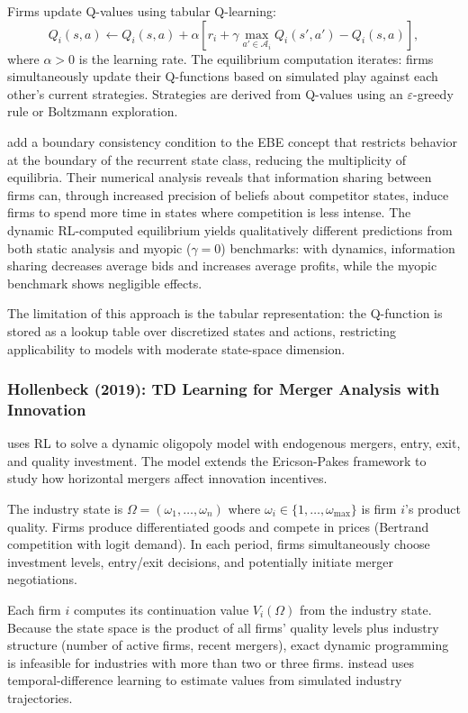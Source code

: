 Firms update Q-values using tabular Q-learning:
\begin{equation}
Q_i(s, a) \leftarrow Q_i(s, a) + \alpha\left[r_i + \gamma \max_{a' \in \mathcal{A}_i} Q_i(s', a') - Q_i(s, a)\right], \label{eq:asker_qupdate}
\end{equation}
where $\alpha > 0$ is the learning rate. The equilibrium computation iterates: firms simultaneously update their Q-functions based on simulated play against each other's current strategies. Strategies are derived from Q-values using an $\varepsilon$-greedy rule or Boltzmann exploration.

\citet{AskerEtAl2020} add a boundary consistency condition to the EBE concept that restricts behavior at the boundary of the recurrent state class, reducing the multiplicity of equilibria. Their numerical analysis reveals that information sharing between firms can, through increased precision of beliefs about competitor states, induce firms to spend more time in states where competition is less intense. The dynamic RL-computed equilibrium yields qualitatively different predictions from both static analysis and myopic ($\gamma = 0$) benchmarks: with dynamics, information sharing decreases average bids and increases average profits, while the myopic benchmark shows negligible effects.

The limitation of this approach is the tabular representation: the Q-function is stored as a lookup table over discretized states and actions, restricting applicability to models with moderate state-space dimension.


\subsubsection{Hollenbeck (2019): TD Learning for Merger Analysis with Innovation}

\citet{Hollenbeck2019} uses RL to solve a dynamic oligopoly model with endogenous mergers, entry, exit, and quality investment. The model extends the Ericson-Pakes framework to study how horizontal mergers affect innovation incentives.

The industry state is $\Omega = (\omega_1, \ldots, \omega_n)$ where $\omega_i \in \{1, \ldots, \omega_{\max}\}$ is firm $i$'s product quality. Firms produce differentiated goods and compete in prices (Bertrand competition with logit demand). In each period, firms simultaneously choose investment levels, entry/exit decisions, and potentially initiate merger negotiations.

Each firm $i$ computes its continuation value $V_i(\Omega)$ from the industry state. Because the state space is the product of all firms' quality levels plus industry structure (number of active firms, recent mergers), exact dynamic programming is infeasible for industries with more than two or three firms. \citet{Hollenbeck2019} instead uses temporal-difference learning to estimate values from simulated industry trajectories.

